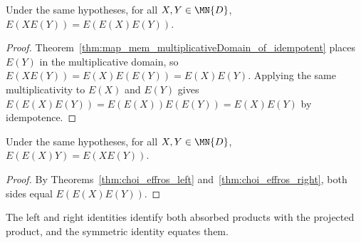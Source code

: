 \begin{theorem}
    \label{thm:choi_effros_right}
    \leanok
    Under the same hypotheses, for all $X,Y\in\MN{D}$,
    $E(XE(Y))=E(E(X)E(Y))$.
\end{theorem}

\begin{proof}\leanok
    Theorem~\ref{thm:map_mem_multiplicativeDomain_of_idempotent} places
    $E(Y)$ in the multiplicative domain, so
    $E(XE(Y))=E(X)E(E(Y))=E(X)E(Y)$.
    Applying the same multiplicativity to $E(X)$ and $E(Y)$ gives
    $E(E(X)E(Y))=E(E(X))E(E(Y))=E(X)E(Y)$ by idempotence.
\end{proof}

\begin{theorem}
    \label{thm:choi_effros_left_eq_right}
    \leanok
    Under the same hypotheses, for all $X,Y\in\MN{D}$,
    $E(E(X)Y)=E(XE(Y))$.
\end{theorem}

\begin{proof}\leanok
    By Theorems~\ref{thm:choi_effros_left}
    and~\ref{thm:choi_effros_right}, both sides equal
    $E(E(X)E(Y))$.
\end{proof}

The left and right identities identify both absorbed products with the
projected product, and the symmetric identity equates them.
